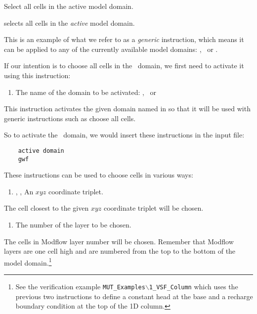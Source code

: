 {
    {Select all cells in the active model domain.
     }

selects all cells in the {\em active} model domain.

This is an example of what we refer to as a {\em generic} instruction, which means it can be applied to any of the currently available model domains: \gwf, \swf\ or \cln.

If our intention is to choose all cells in the \gwf\ domain, we first need to activate it using this instruction:

    {
        \squish
        \begin{enumerate}
        \item {}  The name of the domain to be activated: \gwf, \swf\ or \cln\
        \end{enumerate}
        This instruction activates the given domain named in   so that it will be used with generic instructions such as \textsf{choose all cells}.
    }

So to activate the \gwf\ domain, we would insert these instructions in the input file:
\begin{verbatim}
    active domain
    gwf
\end{verbatim}

These instructions can be used to choose cells in various ways\label{page:cellSelect}:

    {
        \squish
        \begin{enumerate}
        \item {}, ,   An $xyz$ coordinate triplet.
        \end{enumerate}
        The cell closest to the given $xyz$ coordinate triplet will be chosen.
    }

    {
        \squish
        \begin{enumerate}
        \item {}  The number of the layer to be chosen.
        \end{enumerate}
        The cells in Modflow layer number  will be chosen.  Remember that Modflow layers are one cell high and are numbered from the top to the bottom of the model domain.\footnote{ See the verification example \texttt{MUT\_Examples$\backslash$1\_VSF\_Column} which uses the previous two instructions to define a constant head at  the base  and a recharge boundary condition at the top of the 1D column.}
    }

}

